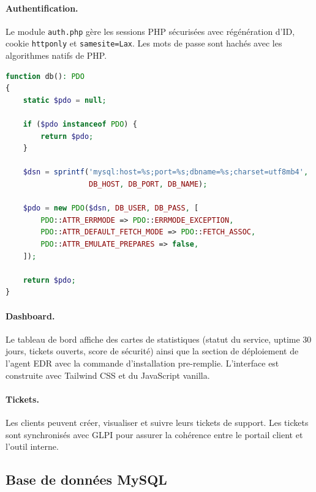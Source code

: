 \paragraph{Authentification.} Le module \texttt{auth.php} gère les
sessions PHP sécurisées avec régénération d'ID, cookie
\texttt{httponly} et \texttt{samesite=Lax}. Les mots de passe sont
hachés avec les algorithmes natifs de PHP.

\begin{lstlisting}[language=PHP, caption={Connexion à la base de données avec PDO}, label={lst:db-connection}]
function db(): PDO
{
    static $pdo = null;

    if ($pdo instanceof PDO) {
        return $pdo;
    }

    $dsn = sprintf('mysql:host=%s;port=%s;dbname=%s;charset=utf8mb4',
                   DB_HOST, DB_PORT, DB_NAME);

    $pdo = new PDO($dsn, DB_USER, DB_PASS, [
        PDO::ATTR_ERRMODE => PDO::ERRMODE_EXCEPTION,
        PDO::ATTR_DEFAULT_FETCH_MODE => PDO::FETCH_ASSOC,
        PDO::ATTR_EMULATE_PREPARES => false,
    ]);

    return $pdo;
}
\end{lstlisting}

\paragraph{Dashboard.} Le tableau de bord affiche des cartes de
statistiques (statut du service, uptime 30 jours, tickets ouverts, score
de sécurité) ainsi que la section de déploiement de l'agent EDR avec la
commande d'installation pre-remplie. L'interface est construite avec
Tailwind CSS et du JavaScript vanilla.

\paragraph{Tickets.} Les clients peuvent créer, visualiser et suivre
leurs tickets de support. Les tickets sont synchronisés avec GLPI pour
assurer la cohérence entre le portail client et l'outil interne.

\subsection{Base de données MySQL}


